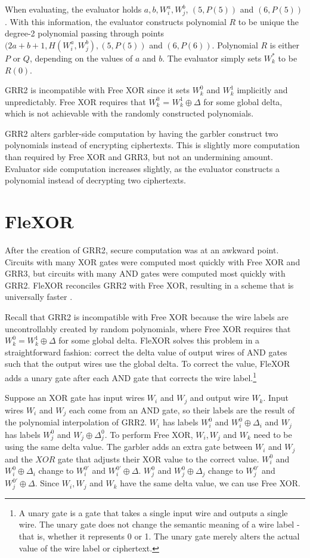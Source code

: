 When evaluating, the evaluator holds $a, b, W_i^a, W_j^b$, $(5, P(5))$ and $(6, P(5))$.
With this information, the evaluator constructs polynomial $R$ to be unique the degree-2 polynomial passing through points $(2a + b + 1, H(W_i^a, W_j^b), (5, P(5))$ and $(6, P(6))$.
Polynomial $R$ is either $P$ or $Q$, depending on the values of $a$ and $b$.
The evaluator simply sets $W_k^*$ to be $R(0)$.

GRR2 is incompatible with Free XOR since it sets $W_k^0$ and $W_k^1$ implicitly and unpredictably.
Free XOR requires that $W_k^0$ = $W_k^1 \oplus \Delta$ for some global delta, which is not achievable with the randomly constructed polynomials.

GRR2 alters garbler-side computation by having the garbler construct two polynomials instead of encrypting ciphertexts.
This is slightly more computation than required by Free XOR and GRR3, but not an undermining amount.
Evaluator side computation increases slightly, as the evaluator constructs a polynomial instead of decrypting two ciphertexts.


\section{FleXOR}
After the creation of GRR2, secure computation was at an awkward point.
Circuits with many XOR gates were computed most quickly with Free XOR and GRR3, but circuits with many AND gates were computed most quickly with GRR2.
FleXOR reconciles GRR2 with Free XOR, resulting in a scheme that is universally faster \cite{flexor}.

Recall that GRR2 is incompatible with Free XOR because the wire labels are uncontrollably created by random polynomials, where Free XOR requires that $W_k^0 = W_k^1 \oplus \Delta$ for some global delta.
FleXOR solves this problem in a straightforward fashion: correct the delta value of output wires of AND gates such that the output wires use the global delta.
To correct the value, FleXOR adds a unary gate after each AND gate that corrects the wire label.\footnote{A unary gate is a gate that takes a single input wire and outputs a single wire. 
The unary gate does not change the semantic meaning of a wire label - that is, whether it represents 0 or 1. The unary gate merely alters the actual value of the wire label or ciphertext.}

Suppose an XOR gate has input wires $W_i$ and $W_j$ and output wire $W_k$.
Input wires $W_i$ and $W_j$ each come from an AND gate, so their labels are the result of the polynomial interpolation of GRR2.
$W_i$ has labels $W_i^0$ and $W_i^0 \oplus \Delta_i$ and $W_j$ has labels $W_j^0$ and $W_j \oplus \Delta_j^0$.
To perform Free XOR, $W_i,W_j$ and $W_k$ need to be using the same delta value. 
The garbler adds an extra gate between $W_i$ and $W_j$ and the $XOR$ gate that adjusts their XOR value to the correct value.
$W_i^0$ and $W_i^0 \oplus \Delta_i$ change to $W_i^{0'}$ and $W_i^{0'} \oplus \Delta$.
$W_j^0$ and $W_j^0 \oplus \Delta_j$ change to $W_j^{0'}$ and $W_j^{0'} \oplus \Delta$.
Since $W_i, W_j$ and $W_k$ have the same delta value, we can use Free XOR.

